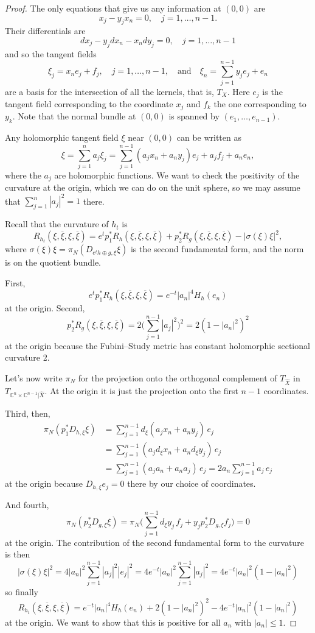 \documentclass[10pt,a4paper]{amsart}
\newcommand{\kk}[1]{\mathbb{#1}}
\def\qandq{\quad\text{and}\quad}
\def\ov#1{\overline{#1}}
\def\hsc{holomorphic sectional curvature}
\def\bl#1{\widehat{#1}}
\def\blX{\bl{X}}
\begin{document}
\begin{proof}
The only equations that give us any information at $(0,0)$ are
$$
x_j - y_j x_n = 0, \quad j = 1, \ldots, n-1.
$$
Their differentials are
$$
dx_j - y_j dx_n - x_n dy_j = 0, \quad j=1,\ldots,n-1
$$
and so the tangent fields
$$
\xi_j = x_n e_j + f_j,
\quad j=1,\ldots,n-1,
\qandq
\xi_n = \sum_{j=1}^{n-1} y_j e_j + e_n
$$
are a basis for
the intersection of all the kernels, that is, $T_X$.
Here $e_j$ is the tangent field corresponding to the coordinate $x_j$
and $f_k$ the one corresponding to $y_k$.
Note that the normal bundle at $(0,0)$ is spanned by $(e_1, \ldots, e_{n-1})$.

Any holomorphic tangent field $\xi$ near $(0,0)$ can be written as
$$
\xi = \sum_{j=1}^n a_j \xi_j
= \sum_{j=1}^{n-1} (a_j x_n + a_n y_j) e_j + a_j f_j
+ a_n e_n,
$$
where the $a_j$ are holomorphic functions.
We want to check the positivity of the curvature at the origin, which we can do
on the unit sphere, so we may assume that $\sum_{j=1}^n |a_j|^2 = 1$ there.

Recall that the curvature of $h_t$ is
$$
R_{h_t}(\xi, \ov\xi, \xi, \ov\xi)
= e^t p_1^* R_h(\xi, \ov\xi, \xi, \ov\xi)
+ p_2^* R_g(\xi, \ov\xi, \xi, \ov\xi)
- |\sigma(\xi)\xi|^2,
$$
where $\sigma(\xi)\xi = \pi_N(D_{e^th \oplus g,\xi} \xi)$ is the second
fundamental form, and the norm is on the quotient bundle.

First,
$$
e^t p_1^*R_h(\xi, \ov\xi, \xi, \ov\xi)
= e^{-t} |a_n|^4 H_h(e_n)
$$
at the origin. Second,
$$
p_2^*R_g(\xi, \ov\xi, \xi, \ov\xi)
= 2 \biggl(\sum_{j=1}^{n-1} |a_j|^2\biggr)^2
= 2(1 - |a_n|^2)^2
$$
at the origin
because the Fubini--Study metric has constant \hsc{} 2.

Let's now write $\pi_N$ for the projection onto the orthogonal complement of
$T_{\blX}$ in $T_{\kk C^n \times \kk C^{n-1}|\blX}$.
At the origin it is just the projection onto the first $n-1$ coordinates.

Third, then,
\begin{align*}
\pi_N(p_1^*D_{h,\xi} \xi)
&= \sum_{j=1}^{n-1} d_{\xi}(a_j x_n + a_n y_j) \, e_j
\\
&= \sum_{j=1}^{n-1} (a_j d_{\xi}x_n + a_n d_{\xi} y_j) \, e_j
\\
&= \sum_{j=1}^{n-1} (a_j a_n + a_n a_j ) \, e_j
= 2 a_n \sum_{j=1}^{n-1} a_j \, e_j
\end{align*}
at the origin
because $D_{h,\xi} e_j = 0$ there by our choice of coordinates.

And fourth,
$$
\pi_N(p_2^*D_{g,\xi} \xi)
= \pi_N \biggl( \sum_{j=1}^{n-1} d_\xi y_j \, f_j + y_j p_2^*D_{g,\xi} f_j \biggr) = 0
$$
at the origin.
The contribution of the second fundamental form to the curvature is then
$$
|\sigma(\xi)\xi|^2
= 4 |a_n|^2 \sum_{j=1}^{n-1} |a_j|^2 |e_j|^2
= 4 e^{-t} |a_n|^2 \sum_{j=1}^{n-1} |a_j|^2
= 4 e^{-t} |a_n|^2(1 - |a_n|^2)
$$
so finally
$$
R_{h_t}(\xi, \ov\xi, \xi, \ov\xi)
= e^{-t} |a_n|^4 H_h(e_n)
+ 2(1 - |a_n|^2)^2
- 4 e^{-t} |a_n|^2(1 - |a_n|^2)
$$
at the origin.
We want to show that this is positive for all $a_n$ with $|a_n| \leq 1$.


\end{proof}
\end{document}
